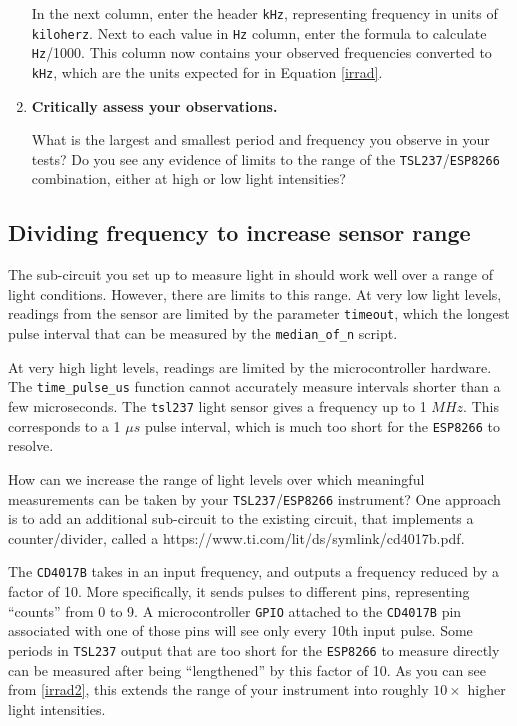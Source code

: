 \begin{enumerate}[resume]
	\smallskip
	In the next column, enter the header \texttt{kHz}, representing frequency in units of \texttt{kiloherz}.
	Next to each value in \texttt{Hz} column, enter the formula to calculate \texttt{Hz}/1000.
	This column now contains your observed frequencies converted to \texttt{kHz}, which are the units expected for in Equation \ref{irrad}.

	\item \textbf{Critically assess your observations.}

	What is the largest and smallest period and frequency you observe in your tests?
	Do you see any evidence of limits to the range of the \texttt{TSL237}/\texttt{ESP8266} combination, either at high or low light intensities?
\end{enumerate}


\subsection{Dividing frequency to increase sensor range}
The sub-circuit you set up to measure light in  should work well over a range of light conditions.
However, there are limits to this range.
At very low light levels, readings from the sensor are limited by the parameter \texttt{timeout}, which the longest pulse interval that can be measured by the \lstinline{median_of_n} script.

At very high light levels, readings are limited by the microcontroller hardware.
The \lstinline{time_pulse_us} function cannot accurately measure intervals shorter than a few microseconds.
The \texttt{tsl237} light sensor gives a frequency up to 1 $MHz$.
This corresponds to a 1 $\mu s$ pulse interval, which is much too short for the \texttt{ESP8266} to resolve.

How can we increase the range of light levels over which meaningful measurements can be taken by your \texttt{TSL237}/\texttt{ESP8266} instrument?
One approach is to add an additional sub-circuit to the existing circuit, that implements a counter/divider, called a  {https://www.ti.com/lit/ds/symlink/cd4017b.pdf}.

The \texttt{CD4017B} takes in an input frequency, and outputs a frequency reduced by a factor of 10.
More specifically, it sends pulses to different pins, representing ``counts'' from 0 to 9.
A microcontroller \texttt{GPIO} attached to the \texttt{CD4017B} pin associated with one of those pins will see only every 10th input pulse.
Some periods in \texttt{TSL237} output that are too short for the \texttt{ESP8266} to measure directly can be measured after being ``lengthened'' by  this factor of 10.
As you can see from \ref{irrad2}, this extends the range of your instrument into roughly $10\times$ higher light intensities.

